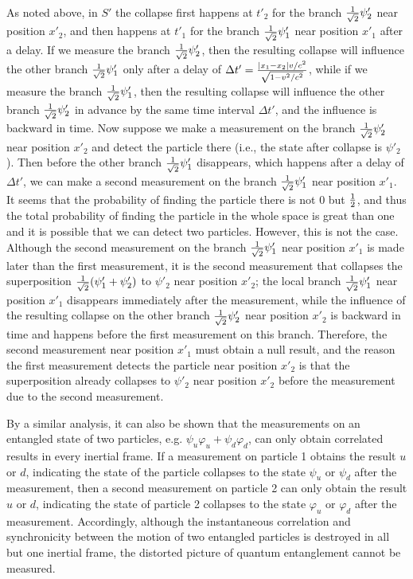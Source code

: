 As noted above, in $S'$ the collapse first happens at $t'_2$ for the branch ${1 \over \sqrt{2}}\psi'_2$ near position $x'_2$, and then happens at $t'_1$ for the branch ${1 \over \sqrt{2}}\psi'_1$ near position $x'_1$ after a delay. If we measure the branch ${1 \over \sqrt{2}}\psi'_2$, then the resulting collapse will influence the other branch ${1 \over \sqrt{2}}\psi'_1$ only after a delay of $\Delta t'={{|x_1-x_2|v/c^2} \over \sqrt{1-v^2/c^2} }$, while if we measure the branch ${1 \over \sqrt{2}}\psi'_1$, then the resulting collapse will influence the other branch ${1 \over \sqrt{2}}\psi'_2$ in advance by the same time interval $\Delta t'$, and the influence is backward in time. Now suppose we make a measurement on the branch ${1 \over \sqrt{2}}\psi'_2$ near position $x'_2$ and detect the particle there (i.e., the state after collapse is $\psi'_2$). Then before the other branch ${1 \over \sqrt{2}}\psi'_1$ disappears, which happens after a delay of $\Delta t'$, we can make a second measurement on the branch ${1 \over \sqrt{2}}\psi'_1$ near position $x'_1$. It seems that the probability of finding the particle there is not 0 but $1 \over 2$, and thus the total probability of finding the particle in the whole space is great than one and it is possible that we can detect two particles. However, this is not the case. Although the second measurement on the branch ${1 \over \sqrt{2}}\psi'_1$ near position $x'_1$ is made later than the first measurement, it is the second measurement that collapses the superposition  ${1 \over \sqrt{2}}(\psi'_1+\psi'_2)$ to $\psi'_2$ near position $x'_2$; the local branch ${1 \over \sqrt{2}}\psi'_1$ near position $x'_1$ disappears immediately after the measurement, while the influence of the resulting collapse on the other branch ${1 \over \sqrt{2}}\psi'_2$ near position $x'_2$ is backward in time and happens before the first measurement on this branch. Therefore, the second measurement near position $x'_1$ must obtain a null result, and the reason the first measurement detects the particle near position $x'_2$ is that the superposition already collapses to $\psi'_2$ near position $x'_2$ before the measurement due to the second measurement.

By a similar analysis, it can also be shown that the measurements on an entangled state of two particles, e.g. $\psi_u\varphi_u+\psi_d\varphi_d$, can only obtain correlated results in every inertial frame. If a measurement on particle 1 obtains the result $u$ or $d$, indicating the state of the particle collapses to the state $\psi_u$ or $\psi_d$ after the measurement, then a second measurement on particle 2 can only obtain the result $u$ or $d$, indicating the state of particle 2 collapses to the state $\varphi_u$ or $\varphi_d$ after the measurement. Accordingly, although the instantaneous correlation and synchronicity between the motion of two entangled particles is destroyed in all but one inertial frame, the distorted picture of quantum entanglement cannot be measured.


